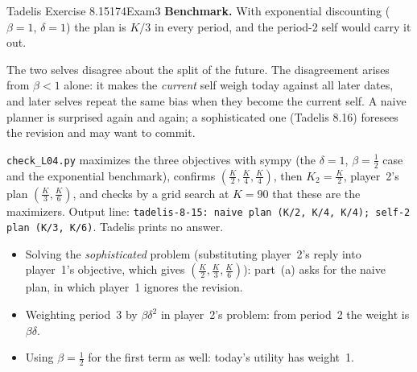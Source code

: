 \begin{exsol}{Tadelis Exercise 8.15}{174}{Exam}{3}
\textbf{Benchmark.} With exponential discounting ($\beta = 1$, $\delta = 1$) the plan is $K/3$ in every
period, and the period-2 self would carry it out.

\interp The two selves disagree about the split of the future. The disagreement arises from $\beta < 1$
alone: it makes the \emph{current} self weigh today against all later dates, and later selves repeat
the same bias when they become the current self. A naive planner is surprised again and again; a
sophisticated one (Tadelis 8.16) foresees the revision and may want to commit.

\verify \texttt{check\_L04.py} maximizes the three objectives with sympy (the $\delta=1$, $\beta = \frac12$
case and the exponential benchmark), confirms $(\frac K2, \frac K4, \frac K4)$, then
$K_2 = \frac K2$, player~2's plan $(\frac K3, \frac K6)$, and checks by a grid search at $K = 90$ that
these are the maximizers. Output line: \texttt{tadelis-8-15: naive plan (K/2, K/4, K/4); self-2 plan
(K/3, K/6)}. Tadelis prints no answer.

\mistakes
\begin{itemize}
  \item Solving the \emph{sophisticated} problem (substituting player~2's reply into player~1's objective, which
  gives $(\frac K2, \frac K3, \frac K6)$): part~(a) asks for the naive plan, in which player~1 ignores the
  revision.
  \item Weighting period~3 by $\beta\delta^2$ in player~2's problem: from period~2 the weight is
  $\beta\delta$.
  \item Using $\beta = \frac12$ for the first term as well: today's utility has weight~1.
\end{itemize}

\end{exsol}
